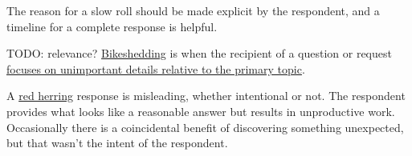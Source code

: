 The reason for a slow roll should be made explicit by the respondent, 
and a timeline for a complete response is helpful. 

TODO: relevance?
\underline{Bikeshedding} is when the recipient of a question or request \href{https://en.wikipedia.org/wiki/Law_of_triviality}{focuses on unimportant details relative to the primary topic}. 

A \underline{red herring} response is misleading, whether intentional or not. The respondent provides what looks like a reasonable answer but results in unproductive work. Occasionally there is a coincidental benefit of discovering something unexpected, but that wasn't the intent of the respondent. 


